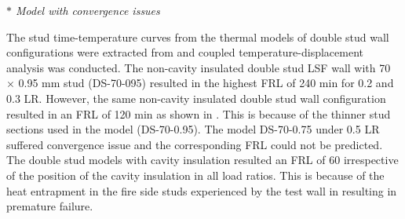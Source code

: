 \begin{table}[!htbp]
	\small \textit{$*$ Model with convergence issues}
  \end{table}%
     
The stud time-temperature curves from the thermal models of double stud wall configurations were extracted from  and coupled temperature-displacement analysis was conducted. The non-cavity insulated double stud LSF wall with 70 $\times$ 0.95 mm stud (DS-70-095) resulted in the highest FRL of 240 min for 0.2 and 0.3 LR. However, the same non-cavity insulated double stud wall configuration resulted in an FRL of 120 min as shown in . This is because of the thinner stud sections used in the model (DS-70-0.95). The model DS-70-0.75 under 0.5 LR suffered convergence issue and the corresponding FRL could not be predicted. The double stud models with cavity insulation resulted an FRL of 60 irrespective of the position of the cavity insulation in all load ratios. This is because of the heat entrapment in the fire side studs experienced by the test wall in  resulting in premature failure. 
